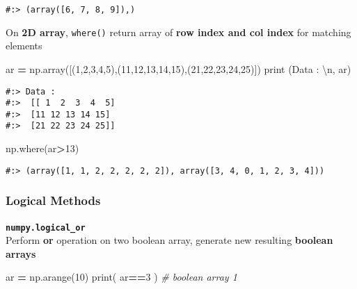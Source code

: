 \documentclass[
]{book}
\newenvironment{Shaded}{\begin{snugshade}}{\end{snugshade}}
\newcommand{\BuiltInTok}[1]{#1}
\newcommand{\CharTok}[1]{\textcolor[rgb]{0.5,0.5,0.5}{#1}}
\newcommand{\CommentTok}[1]{\textcolor[rgb]{0.37,0.37,0.37}{\textit{#1}}}
\newcommand{\DecValTok}[1]{\textcolor[rgb]{0.06,0.06,0.06}{#1}}
\newcommand{\NormalTok}[1]{#1}
\newcommand{\OperatorTok}[1]{\textcolor[rgb]{0.43,0.43,0.43}{\textbf{#1}}}
\newcommand{\StringTok}[1]{\textcolor[rgb]{0.5,0.5,0.5}{#1}}
\begin{document}
\begin{verbatim}
#:> (array([6, 7, 8, 9]),)
\end{verbatim}

On \textbf{2D array}, \texttt{where()} return array of \textbf{row index and col index} for matching elements

\begin{Shaded}
\begin{Highlighting}[]
\NormalTok{ar }\OperatorTok{=}\NormalTok{ np.array([(}\DecValTok{1}\NormalTok{,}\DecValTok{2}\NormalTok{,}\DecValTok{3}\NormalTok{,}\DecValTok{4}\NormalTok{,}\DecValTok{5}\NormalTok{),(}\DecValTok{11}\NormalTok{,}\DecValTok{12}\NormalTok{,}\DecValTok{13}\NormalTok{,}\DecValTok{14}\NormalTok{,}\DecValTok{15}\NormalTok{),(}\DecValTok{21}\NormalTok{,}\DecValTok{22}\NormalTok{,}\DecValTok{23}\NormalTok{,}\DecValTok{24}\NormalTok{,}\DecValTok{25}\NormalTok{)])}
\BuiltInTok{print}\NormalTok{ (}\StringTok{\textquotesingle{}Data : }\CharTok{\textbackslash{}n}\StringTok{\textquotesingle{}}\NormalTok{, ar)}
\end{Highlighting}
\end{Shaded}

\begin{verbatim}
#:> Data : 
#:>  [[ 1  2  3  4  5]
#:>  [11 12 13 14 15]
#:>  [21 22 23 24 25]]
\end{verbatim}

\begin{Shaded}
\begin{Highlighting}[]
\NormalTok{np.where(ar}\OperatorTok{\textgreater{}}\DecValTok{13}\NormalTok{)}
\end{Highlighting}
\end{Shaded}

\begin{verbatim}
#:> (array([1, 1, 2, 2, 2, 2, 2]), array([3, 4, 0, 1, 2, 3, 4]))
\end{verbatim}

\hypertarget{logical-methods}{%
\subsubsection{Logical Methods}\label{logical-methods}}

\textbf{\texttt{numpy.logical\_or}}~\\
Perform \textbf{or} operation on two boolean array, generate new resulting \textbf{boolean arrays}

\begin{Shaded}
\begin{Highlighting}[]
\NormalTok{ar }\OperatorTok{=}\NormalTok{ np.arange(}\DecValTok{10}\NormalTok{)}
\BuiltInTok{print}\NormalTok{( ar}\OperatorTok{==}\DecValTok{3}\NormalTok{ )  }\CommentTok{\# boolean array 1}
\end{Highlighting}
\end{Shaded}
\end{document}
